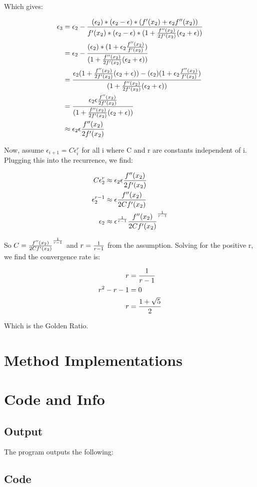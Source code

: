 \documentclass{article}
\begin{document}
Which gives: 

\begin{align*}
	\epsilon_3 &= \epsilon_2 - {(\epsilon_2) * (\epsilon_2  - \epsilon) * ( f'(x_2) + \epsilon_2 f''(x_2)) \over 
						f'(x_2) * (\epsilon_2 - \epsilon) * (1 + {f''(x_2) \over 2f'(x_2)} (\epsilon_2 + \epsilon))} \\
			&=  \epsilon_2 - {(\epsilon_2) * (1 + \epsilon_2 {f''(x_2) \over f'(x_2)}) \over 
						(1 + {f''(x_2) \over 2f'(x_2)} (\epsilon_2 + \epsilon))} \\
			&= {\epsilon_2 (1 + {f''(x_2) \over 2f'(x_2)} (\epsilon_2 + \epsilon)) - (\epsilon_2) (1 + \epsilon_2 {f''(x_2) \over f'(x_2)}) \over 
						(1 + {f''(x_2) \over 2f'(x_2)} (\epsilon_2 + \epsilon))} \\
			&= {\epsilon_2  \epsilon {f''(x_2) \over 2f'(x_2)}  \over 
						(1 + {f''(x_2) \over 2f'(x_2)} (\epsilon_2 + \epsilon))} \\
			&\approx \epsilon_2  \epsilon {f''(x_2) \over 2f'(x_2)}
\end{align*}

Now, assume $\epsilon_{i+1} = C \epsilon_i ^ r$ for all i where C and r are constants independent of i. Plugging this into the recurrence, we find:

\begin{align*}
	C \epsilon_2 ^ r &\approx \epsilon_2  \epsilon {f''(x_2) \over 2f'(x_2)} \\
	\epsilon_2	 ^ {r-1} &\approx \epsilon {f''(x_2) \over 2Cf'(x_2)} \\
	\epsilon_2	 &\approx \epsilon ^ {1 \over r-1} {f''(x_2) \over 2Cf'(x_2)}^ {1 \over r-1} \\
\end{align*}

So $C = {f''(x_2) \over 2Cf'(x_2)}^ {1 \over r-1}$ and $r = {1 \over r - 1}$ from the assumption. Solving for the positive r, we find the convergence rate is:

\begin{align*}
	r &= {1 \over r - 1} \\
	r^2 - r - 1&= 0 \\
	r &= {1 + \sqrt5 \over 2}
\end{align*}

Which is the Golden Ratio.

\section{Method Implementations}

\section{Code and Info}

\subsection{Output}
The program outputs the following:
% 

\subsection{Code}
\end{document}
